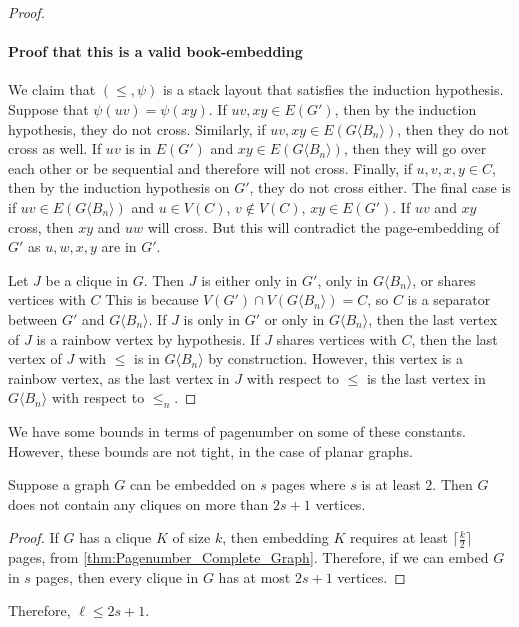 \begin{proof}
	\paragraph{Proof that this is a valid book-embedding}
	We claim that \((\leq , \psi)\) is a stack layout that satisfies the induction hypothesis. Suppose that \(\psi(uv) = \psi(xy)\). If \(uv, xy \in E(G')\), then by the induction hypothesis, they do not cross. Similarly, if \(uv, xy \in E(G \langle B_n \rangle)\), then they do not cross as well. If \(uv\) is in \(E(G')\) and \(xy \in E(G \langle B_n \rangle)\), then they will go over each other or be sequential and therefore will not cross.
	Finally, if \(u, v, x, y \in C\), then by the induction hypothesis on \(G'\), they do not cross either. The final case is if \(uv \in E(G\langle B_{n} \rangle)\) and \(u \in V(C)\), \(v \notin V(C)\), \(xy \in E(G')\). If \(uv\) and \(xy\) cross, then \(xy\) and \(uw\) will cross. But this will contradict the page-embedding of \(G'\) as $u, w, x, y$ are in $G'$.

	Let \(J\) be a clique in \(G\). Then $J$ is either only in $G'$, only in $G\langle B_n \rangle$, or shares vertices with $C$ This is because $V(G') \cap V(G\langle B_n \rangle) = C$, so $C$ is a separator between $G'$ and $G \langle B_n \rangle$. If $J$ is only in $G'$ or only in $G\langle B_n \rangle$, then the last vertex of $J$ is a rainbow vertex by hypothesis. If $J$ shares vertices with $C$, then the last vertex of $J$ with $\leq$ is in $G\langle B_n \rangle$ by construction. However, this vertex is a rainbow vertex, as the last vertex in $J$ with respect to $\leq$ is the last vertex in $G\langle B_n \rangle$ with respect to $\leq_n$. 
\end{proof}

We have some bounds in terms of pagenumber on some of these constants. However, these bounds are not tight, in the case of planar graphs. 

\begin{lemma}
	Suppose a graph $G$ can be embedded on $s$ pages where $s$ is at least $2$. Then \(G\) does not contain any cliques on more than \(2s+1\) vertices.
\end{lemma}

\begin{proof}
	If \(G\) has a clique $K$ of size \(k\), then embedding $K$ requires at least \(\lceil \frac{k}{2} \rceil\) pages, from \cref{thm:Pagenumber_Complete_Graph}. Therefore, if we can embed \(G\) in \(s\) pages, then every clique in $G$ has at most \(2s + 1\) vertices.
\end{proof}
Therefore, \(\ell \leq 2s + 1\).

